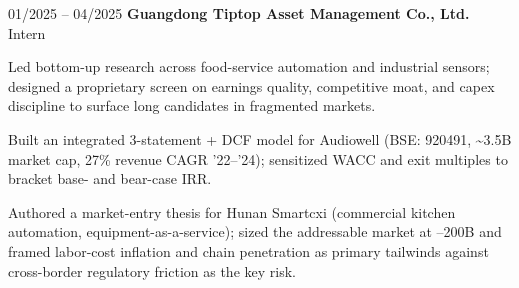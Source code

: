 \begin{twocolentry}{01/2025 – 04/2025}
\textbf{Guangdong Tiptop Asset Management Co., Ltd.} \\
Intern
\end{twocolentry}
\begin{onecolentry}
\begin{highlights}
\item Led bottom-up research across food-service automation and industrial sensors; designed a proprietary screen on earnings quality, competitive moat, and capex discipline to surface long candidates in fragmented markets.
\item Built an integrated 3-statement + DCF model for Audiowell (BSE: 920491, \textasciitilde\textyen3.5B market cap, 27\% revenue CAGR '22--'24); sensitized WACC and exit multiples to bracket base- and bear-case IRR.
\item Authored a market-entry thesis for Hunan Smartcxi (commercial kitchen automation, equipment-as-a-service); sized the addressable market at --200B and framed labor-cost inflation and chain penetration as primary tailwinds against cross-border regulatory friction as the key risk.
\end{highlights}
\end{onecolentry}